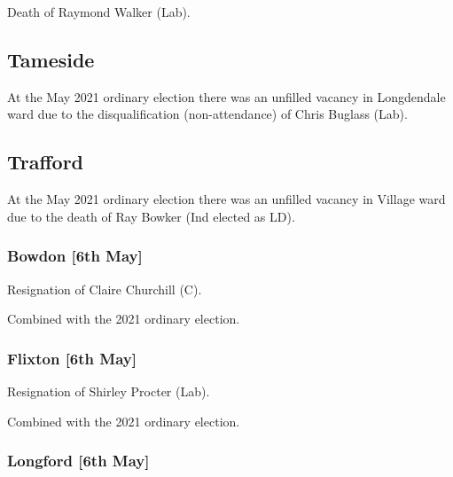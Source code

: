 \documentclass[a4paper,openany]{book}
\begin{document}
\begin{resultsiii}

Death of Raymond Walker (Lab).

\subsection*{Tameside}

At the May 2021 ordinary election there was an unfilled vacancy in Longdendale ward due to the disqualification (non-attendance) of Chris Buglass (Lab).

\subsection*{Trafford}

At the May 2021 ordinary election there was an unfilled vacancy in Village ward due to the death of Ray Bowker (Ind elected as LD).

\subsubsection*{Bowdon \hspace*{\fill}\nolinebreak[1]%
	\enspace\hspace*{\fill}
	[6th May]}


Resignation of Claire Churchill (C).

Combined with the 2021 ordinary election.

\subsubsection*{Flixton \hspace*{\fill}\nolinebreak[1]%
	\enspace\hspace*{\fill}
	[6th May]}


Resignation of Shirley Procter (Lab).

Combined with the 2021 ordinary election.

\subsubsection*{Longford \hspace*{\fill}\nolinebreak[1]%
	\enspace\hspace*{\fill}
	[6th May]}


\end{resultsiii}
\end{document}
